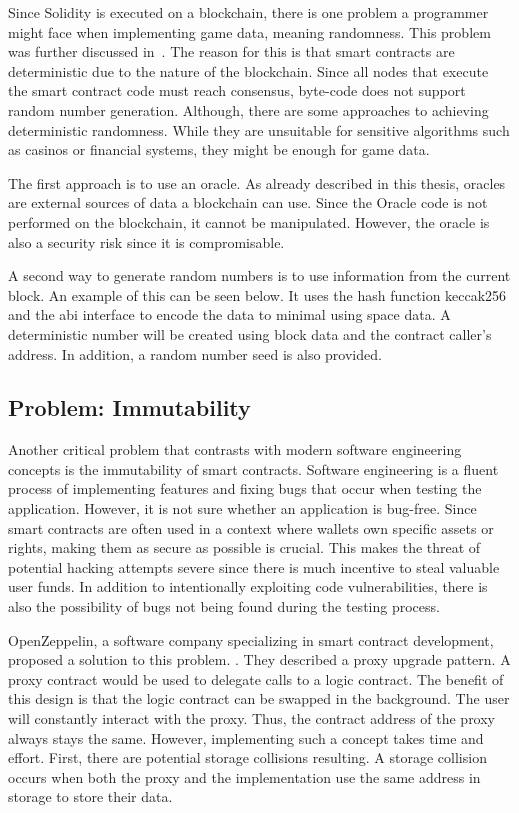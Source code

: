 Since Solidity is executed on a blockchain, there is one problem a programmer might face when implementing game data, meaning randomness.
This problem was further discussed in~\cite{8751326}.
The reason for this is that smart contracts are deterministic due to the nature of the blockchain.
Since all nodes that execute the smart contract code must reach consensus, byte-code does not support random number generation.
Although, there are some approaches to achieving deterministic randomness.
While they are unsuitable for sensitive algorithms such as casinos or financial systems, they might be enough for game data.

The first approach is to use an oracle. 
As already described in this thesis, oracles are external sources of data a blockchain can use.
Since the Oracle code is not performed on the blockchain, it cannot be manipulated. 
However, the oracle is also a security risk since it is compromisable.

A second way to generate random numbers is to use information from the current block.
An example of this can be seen below.
It uses the hash function keccak256 and the abi interface to encode the data to minimal using space data.
A deterministic number will be created using block data and the contract caller's address.
In addition, a random number seed is also provided.


\subsection{Problem: Immutability}
Another critical problem that contrasts with modern software engineering concepts is the immutability of smart contracts.
Software engineering is a fluent process of implementing features and fixing bugs that occur when testing the application.
However, it is not sure whether an application is bug-free.
Since smart contracts are often used in a context where wallets own specific assets or rights, making them as secure as possible is crucial.
This makes the threat of potential hacking attempts severe since there is much incentive to steal valuable user funds.
In addition to intentionally exploiting code vulnerabilities, there is also the possibility of bugs not being found during the testing process.

OpenZeppelin, a software company specializing in smart contract development, proposed a solution to this problem. \cite{zeppelin_proxy}.
They described a proxy upgrade pattern.
A proxy contract would be used to delegate calls to a logic contract.
The benefit of this design is that the logic contract can be swapped in the background.
The user will constantly interact with the proxy.
Thus, the contract address of the proxy always stays the same.
However, implementing such a concept takes time and effort.
First, there are potential storage collisions resulting.
A storage collision occurs when both the proxy and the implementation use the same address in storage to store their data.



